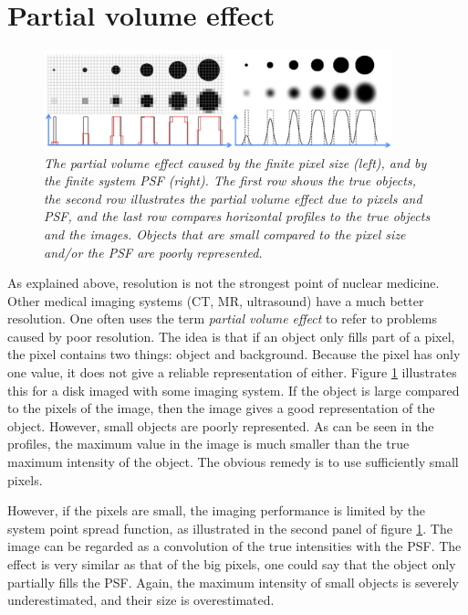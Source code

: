 \section{Partial volume effect \label{sec:pv}}
\begin{figure}[tb]
\centering
\includegraphics[width=0.9\textwidth]{figs/fig_pv.pdf}
\caption{\label{fig:pv} \emph{The partial volume effect caused by the
finite pixel size (left), and by the finite system PSF (right). The
first row shows the true objects, the second row illustrates the
partial volume effect due to pixels and PSF, and the last row compares
horizontal profiles to the true objects and the images.  Objects that
are small compared to the pixel size and/or the PSF are poorly
represented.}}
\end{figure}
%
As explained above, resolution is not the strongest point of nuclear
medicine. Other medical imaging systems (CT, MR, ultrasound) have a
much better resolution. One often uses the term {\em partial volume
effect} to refer to problems caused by poor resolution. The idea is
that if an object only fills part of a pixel, the pixel contains two
things: object and background. Because the pixel has only one value,
it does not give a reliable representation of either. Figure
\ref{fig:pv} illustrates this for a disk imaged with some imaging
system. If the object is large compared to the pixels of the image,
then the image gives a good representation of the object. However,
small objects are poorly represented. As can be seen in the profiles,
the maximum value in the image is much smaller than the true maximum
intensity of the object. The obvious remedy is to use sufficiently
small pixels.

However, if the pixels are small, the imaging performance is limited
by the system point spread function, as illustrated in the second
panel of figure \ref{fig:pv}. The image can be regarded as a
convolution of the true intensities with the PSF. The effect is very
similar as that of the big pixels, one could say that the object only
partially fills the PSF. Again, the maximum intensity of small objects
is severely underestimated, and their size is overestimated.

